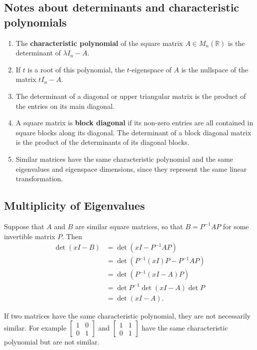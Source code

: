 \documentclass[a4paper, 9pt]{extarticle}
\begin{document}
\subsection{Notes about determinants and characteristic polynomials}
\begin{enumerate}
  \item The \textbf{characteristic polynomial} of the square matrix $A \in M_n(\mathbb{R})$ is the determinant of $\lambda I_n - A$.
  \item If $t$ is a root of this polynomial, the $t$-eigenspace of $A$ is the nullspace of the matrix $tI_n - A$.
  \item The determinant of a diagonal or upper triangular matrix is the product of the entries on its main diagonal.
  \item A square matrix is \textbf{block diagonal} if its non-zero entries are all contained in square blocks along its diagonal. The determinant of a block diagonal matrix is the product of the determinants of its diagonal blocks.
  \item Similar matrices have the same characteristic polynomial and the same eigenvalues and eigenspace dimensions, since they represent the same linear transformation.
\end{enumerate}

\subsection{Multiplicity of Eigenvalues}
Suppose that $A$ and $B$ are similar square matrices, so that $B = P^{-1}AP$ for some invertible matrix $P$. Then
\begin{align*}
  \det(xI - B) & = \det(xI - P^{-1}AP)              \\
               & = \det(P^{-1}(xI)P - P^{-1}AP)     \\
               & = \det\left(P^{-1}(xI - A)P\right) \\
               & = \det P^{-1} \det(xI - A) \det P  \\
               & = \det(xI - A).
\end{align*}

If two matrices have the same characteristic polynomial, they are not necessarily similar. For example $\begin{bmatrix} 1 & 0 \\ 0 & 1 \end{bmatrix}$ and $\begin{bmatrix} 1 & 1 \\ 0 & 1 \end{bmatrix}$ have the same characteristic polynomial but are not similar.
\end{document}
